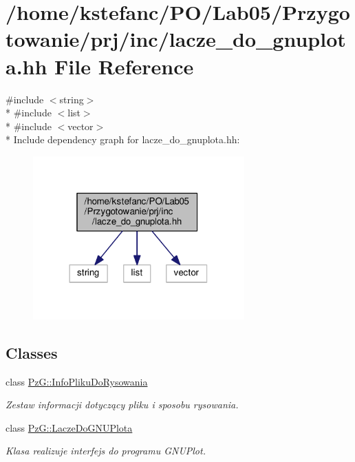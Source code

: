 \hypertarget{lacze__do__gnuplota_8hh}{\section{/home/kstefanc/\+P\+O/\+Lab05/\+Przygotowanie/prj/inc/lacze\+\_\+do\+\_\+gnuplota.hh File Reference}
\label{lacze__do__gnuplota_8hh}
}
{\ttfamily \#include $<$string$>$}\\*
{\ttfamily \#include $<$list$>$}\\*
{\ttfamily \#include $<$vector$>$}\\*
Include dependency graph for lacze\+\_\+do\+\_\+gnuplota.\+hh\+:\nopagebreak
\begin{figure}[H]
\begin{center}
\leavevmode
\includegraphics[width=230pt]{lacze__do__gnuplota_8hh__incl}
\end{center}
\end{figure}
\subsection*{Classes}
\begin{DoxyCompactItemize}
\item 
class \hyperlink{class_pz_g_1_1_info_pliku_do_rysowania}{Pz\+G\+::\+Info\+Pliku\+Do\+Rysowania}
\begin{DoxyCompactList}\small\item\em Zestaw informacji dotyczący pliku i sposobu rysowania. \end{DoxyCompactList}\item 
class \hyperlink{class_pz_g_1_1_lacze_do_g_n_u_plota}{Pz\+G\+::\+Lacze\+Do\+G\+N\+U\+Plota}
\begin{DoxyCompactList}\small\item\em Klasa realizuje interfejs do programu G\+N\+U\+Plot. \end{DoxyCompactList}\end{DoxyCompactItemize}
